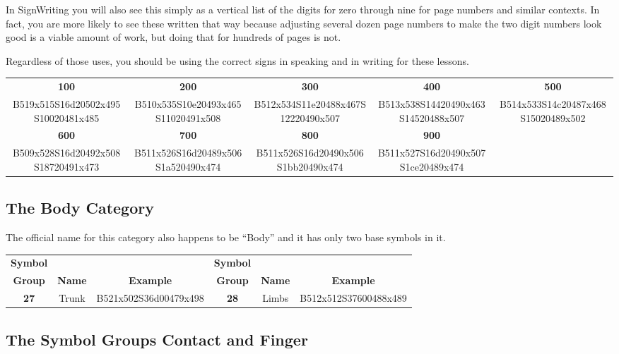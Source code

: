 \documentclass{article}
\begin{document}
In SignWriting you will also see this simply as a vertical list of the digits for zero through nine for page numbers and similar contexts.
In fact, you are more likely to see these written that way because adjusting several dozen page numbers to make the two digit numbers look good is a viable amount of work, but doing that for hundreds of pages is not.

Regardless of those uses, you should be using the correct signs in speaking and in writing for these lessons.

\begin{center}
\begin{tabular}{*{5}{c}}
\textbf{100}&\textbf{200}&\textbf{300}&\textbf{400}&\textbf{500}\\
B519x515S16d20502x495S10020481x485&
B510x535S10e20493x465S11020491x508&
B512x534S11e20488x467S12220490x507&
B513x538S14420490x463S14520488x507&
B514x533S14c20487x468S15020489x502\\
\textbf{600}&\textbf{700}&\textbf{800}&\textbf{900}\\
B509x528S16d20492x508S18720491x473&
B511x526S16d20489x506S1a520490x474&
B511x526S16d20490x506S1bb20490x474&
B511x527S16d20490x507S1ce20489x474\\
\end{tabular}
\end{center}

\subsection{The Body Category}

The official name for this category also happens to be ``Body'' and it has only two base symbols in it.

\begin{center}
\begin{tabular}{ccc@{\hskip 5mm}ccc}
\textbf{Symbol}&&&\textbf{Symbol}\\
\textbf{Group}&\textbf{Name}&\textbf{Example}&\textbf{Group}&\textbf{Name}&\textbf{Example}\\
\textbf{27}&Trunk&B521x502S36d00479x498&\textbf{28}&Limbs&B512x512S37600488x489\\
\end{tabular}
\end{center}

\subsection{The Symbol Groups Contact and Finger}
\end{document}
